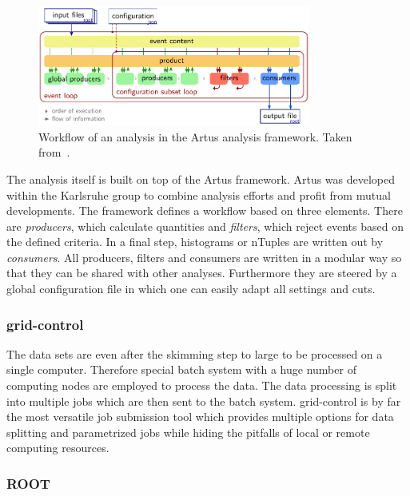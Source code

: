 \begin{figure}[htp]
    \centering
    \includegraphics[width=0.8\textwidth]{figures/cms_detector/artus_workflow.pdf}
    \caption[Workflow of an analysis in the Artus framework]{Workflow of an
        analysis in the Artus analysis framework. Taken
        from~\cite{Berger:2014aca}.}
    \label{fig:artus_workflow}
\end{figure}

The analysis itself is built on top of the Artus framework. Artus was developed
within the Karlsruhe group to combine analysis efforts and profit from mutual
developments. The framework defines a workflow based on three elements. There
are \emph{producers}, which calculate quantities and \emph{filters}, which
reject events based on the defined criteria. In a final step, histograms or
nTuples are written out by \emph{consumers}. All producers, filters and
consumers are written in a modular way so that they can be shared with other
analyses. Furthermore they are steered by a global configuration file in which
one can easily adapt all settings and cuts.

\subsubsection{grid-control}

The data sets are even after the skimming step to large to be processed on a
single computer. Therefore special batch system with a huge number of computing
nodes are employed to process the data. The data processing is split into
multiple jobs which are then sent to the batch system. grid-control is by far
the most versatile job submission tool which provides multiple options for data
splitting and parametrized jobs while hiding the pitfalls of local or remote
computing resources.

\subsubsection{ROOT}

